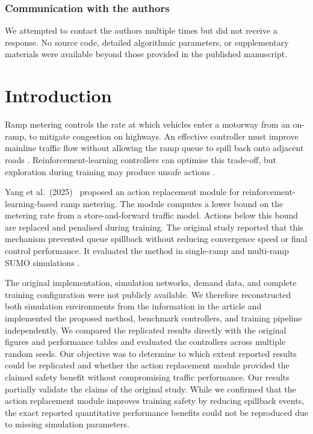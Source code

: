 \subsubsection{Communication with the authors}

We attempted to contact the authors multiple times but did not receive a response. No source code, detailed algorithmic parameters, or supplementary materials were available beyond those provided in the published manuscript.


\section{Introduction}

Ramp metering controls the rate at which vehicles enter a motorway from an on-ramp, to mitigate congestion on highways. An effective controller must improve mainline traffic flow without allowing the ramp queue to spill back onto adjacent roads \cite{Trubia2021RampMetering}. Reinforcement-learning controllers can optimise this trade-off, but exploration during training may produce unsafe actions \cite{han2023leveraging}.

Yang et al.~(2025)~\cite{Yang2025Reinforcement} proposed an action replacement module for reinforcement-learning-based ramp metering. The module computes a lower bound on the metering rate from a store-and-forward traffic model. Actions below this bound are replaced and penalised during training. The original study reported that this mechanism prevented queue spillback without reducing convergence speed or final control performance. It evaluated the method in single-ramp and multi-ramp SUMO simulations \cite{lopez2018microscopic}.

The original implementation, simulation networks, demand data, and complete training configuration were not publicly available. We therefore reconstructed both simulation environments from the information in the article and implemented the proposed method, benchmark controllers, and training pipeline independently. We compared the replicated results directly with the original figures and performance tables and evaluated the controllers across multiple random seeds. Our objective was to determine to which extent reported results could be replicated and whether the action replacement module provided the claimed safety benefit without compromising traffic performance. Our results partially validate the claims of the original study. While we confirmed that the action replacement module improves training safety by reducing spillback events, the exact reported quantitative performance benefits could not be reproduced due to missing simulation parameters.

